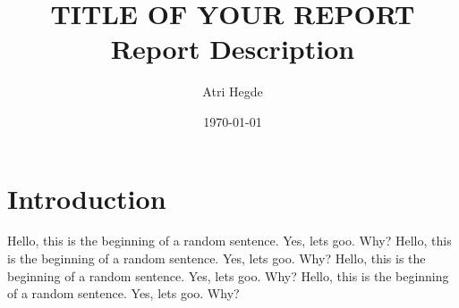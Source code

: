 \documentclass[a4paper,11pt]{article}
\author{Atri Hegde}
\date{\today}
\title{TITLE OF YOUR REPORT\\\medskip
\large Report Description}
\begin{document}
\maketitle
\tableofcontents

\newpage
\section{Introduction}
\label{sec:org68d6865}
Hello, this is the beginning of a random sentence. Yes, lets goo. Why?
Hello, this is the beginning of a random sentence. Yes, lets goo. Why?
Hello, this is the beginning of a random sentence. Yes, lets goo. Why?
Hello, this is the beginning of a random sentence. Yes, lets goo. Why?

\newpage
\printbibliography
\end{document}
